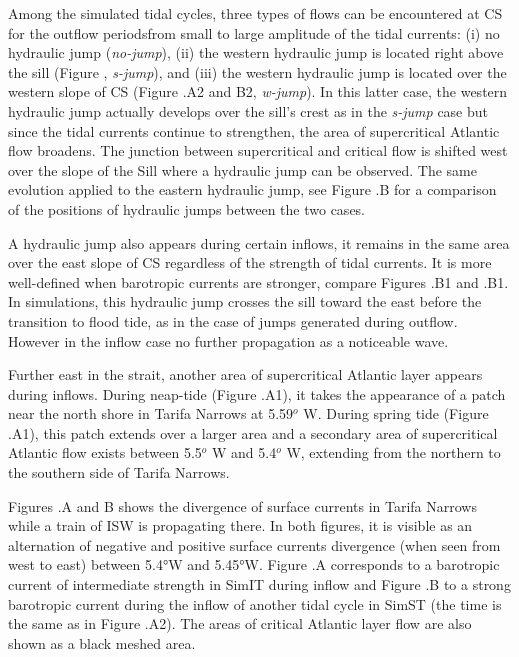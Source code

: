 Among the simulated tidal cycles, three types of flows can be encountered at CS for the outflow periods\color{red}from small to large amplitude of the tidal currents\color{black}: (i) no hydraulic jump (\textit{no-jump}), (ii) the western hydraulic jump is located right above the sill (Figure , \textit{s-jump}), and (iii) the western hydraulic jump is located over the western slope of CS (Figure .A2 and B2, \textit{w-jump}). In this latter case, the western hydraulic jump actually develops over the sill's crest as in the \textit{s-jump} case but since the tidal currents continue to strengthen, the area of supercritical Atlantic flow broadens. The junction between supercritical and critical flow is shifted west over the slope of the Sill where a hydraulic jump can be observed. The same evolution applied to the eastern hydraulic jump, see Figure .B for a comparison of the positions of hydraulic jumps between the two cases. 

A hydraulic jump also appears during \color{red}certain \color{black}inflows, it remains in the same area over the east slope of CS regardless of the strength of tidal currents. It is more well-defined when barotropic currents are stronger, compare Figures .B1 and .B1. \color{red}In simulations, this hydraulic jump crosses the sill toward the east before the transition to flood tide, as in the case of jumps generated during outflow. However in the inflow case no further propagation as a noticeable wave.\color{black}

Further east in the strait, another area of supercritical Atlantic layer appears during inflows. During neap-tide (Figure .A1), it takes the appearance of a patch near the north shore in Tarifa Narrows at 5.59$^o$ W. During spring tide (Figure .A1), this patch extends over a larger area and a secondary area of supercritical Atlantic flow exists between 5.5$^o$ W and 5.4$^o$ W, extending from the northern to the southern side of Tarifa Narrows. 

Figures .A and B shows the divergence of surface currents in Tarifa Narrows while a train of ISW is propagating there. In both figures, it is visible as an alternation of negative and positive surface currents divergence (when seen from west to east) between 5.4°W and 5.45°W. Figure .A corresponds to a barotropic current of intermediate strength in SimIT during inflow and Figure .B to a strong barotropic current during the inflow of another tidal cycle in SimST (the time is the same as in Figure .A2). The areas of critical Atlantic layer flow are also shown as a black meshed area. 

